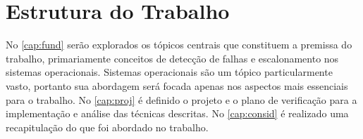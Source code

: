 \section{Estrutura do Trabalho}

No \autoref{cap:fund} serão explorados os tópicos centrais que constituem a premissa do trabalho, primariamente conceitos de detecção de falhas e escalonamento nos sistemas operacionais. Sistemas operacionais são um tópico particularmente vasto, portanto sua abordagem será focada apenas nos aspectos mais essenciais para o trabalho. No \autoref{cap:proj} é definido o projeto e o plano de verificação para a implementação e análise das técnicas descritas. No \autoref{cap:consid} é realizado uma recapitulação do que foi abordado no trabalho.


